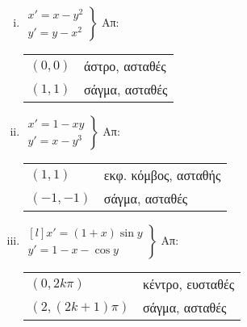 \begin{enumerate}
\begin{enumerate}[i)]
        \item $ 
            \left.
                \begin{matrix}
                    x' = x-y^{2} \\
                    y' = y-x^{2}
                \end{matrix}
            \right\}$ \hfill Απ: \begin{tabular}{ll}
                $ (0,0) $ & άστρο, ασταθές \\
                $ (1,1) $ & σάγμα, ασταθές
            \end{tabular}

        \item $ 
            \left.
                \begin{matrix}
                    x' = 1-xy \\
                    y' = x-y^{3}
                \end{matrix}
            \right\}$ \hfill Απ: \begin{tabular}{ll}
                $ (1,1) $ & εκφ. κόμβος, ασταθής \\
                $ (-1,-1) $ & σάγμα, ασταθές
            \end{tabular} 

        \item $ 
            \left.
                \begin{matrix*}[l]
                    x' = (1+x) \sin{y} \\
                    y' = 1-x - \cos{y}
                \end{matrix*}
            \right\}$ \hfill Απ: \begin{tabular}{ll}
                $ (0,2k \pi) $ & κέντρο, ευσταθές \\
                $ (2, (2k+1) \pi) $ & σάγμα, ασταθές
            \end{tabular} 

        \end{enumerate}


\end{enumerate}
